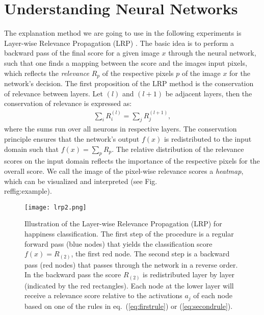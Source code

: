\documentclass[runningheads]{llncs}
\begin{document}
\section{Understanding Neural Networks}
The explanation method we are going to use in the following experiments is Layer-wise Relevance Propagation (LRP) \cite{bach2015pixel}. The basic idea is to perform a backward pass of the final score for a given image $x$ through the neural network, such that one finds a mapping between the score and the images input pixels, which reflects the {\it relevance} $R_p$ of the respective pixels $p$ of the image  $x$ for the network's decision. The first proposition of the LRP method is the conservation of relevance between layers. Let $(l)$ and $(l+1)$ be adjacent layers, then the conservation of relevance is expressed as:
\begin{align}
   \sum_{i} R_{i}^{(l)} = \sum_{j} R_{j}^{(l + 1)},
\end{align}
where the sums run over all neurons in respective layers. The conservation principle ensures that the network's output $f(x)$ is redistributed to the input domain such that $f(x) = \sum_p R_p$.
The relative distribution of the relevance scores on the input domain reflects the importance of the respective pixels for the overall score.
We call the image of the pixel-wise relevance scores a {\it heatmap}, which can be visualized and interpreted (see Fig.\\ref{fig:example}).
\begin{figure}[t]
\centering
\texttt{[image: lrp2.png]}
\caption{
Illustration of the Layer-wise Relevance Propagation (LRP) for happiness classification. The first step of the procedure is a regular forward pass (blue nodes) that yields the classification score $f(x) = R_{(2)}$, the first red node. The second step is a backward pass (red nodes) that passes through the network in a reverse order. In the backward pass the score $R_{(2)}$ is redistributed layer by layer (indicated by the red rectangles). Each node at the lower layer will receive a relevance score relative to the activations $ a_{j}$ of each node based on one of the rules in eq.~(\ref{eq:firstrule}) or  (\ref{eq:secondrule}). 
}
\label{fig:example}
\end{figure}
\end{document}
